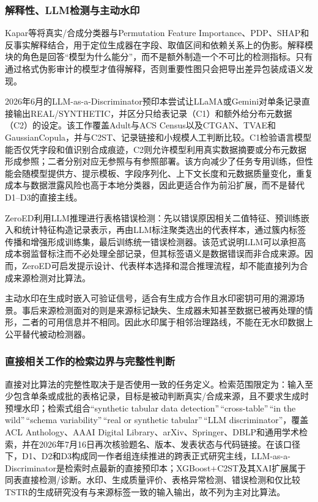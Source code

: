 \documentclass[
  chinese,
  12pt,
  a4paper,
  chinese,
  UTF8]{ctexart}
\begin{document}
\subsubsection{解释性、LLM检测与主动水印}\label{ux89e3ux91caux6027llmux68c0ux6d4bux4e0eux4e3bux52a8ux6c34ux5370}

Kapar等将真实/合成分类器与Permutation Feature
Importance、PDP、SHAP和反事实解释结合，用于定位生成器在字段、取值区间和依赖关系上的伪影\autocite{kapar2026xai}。解释模块的角色是回答``模型为什么能分''，而不是额外制造一个不可比的检测指标。只有通过格式伪影审计的模型才值得解释，否则重要性图只会把导出差异包装成语义发现。

2026年6月的LLM-as-a-Discriminator预印本尝试让LLaMA或Gemini对单条记录直接输出REAL/SYNTHETIC，并区分只给表记录（C1）和额外给分布元数据（C2）的设定\autocite{slokom2026llm}。该工作覆盖Adult与ACS
Census以及CTGAN、TVAE和GaussianCopula，并与C2ST、记录链接和小规模人工判断比较。C1检验语言模型能否仅凭字段和值识别合成痕迹，C2则允许模型利用真实数据摘要或分布元数据形成参照；二者分别对应无参照与有参照部署。该方向减少了任务专用训练，但性能会随模型提供方、提示模板、字段序列化、上下文长度和元数据质量变化，重复成本与数据泄露风险也高于本地分类器，因此更适合作为前沿扩展，而不是替代D1--D3的直接主线。

ZeroED利用LLM推理进行表格错误检测\autocite{ni2025zeroed}：先以错误原因相关二值特征、预训练嵌入和统计特征构造记录表示，再由LLM标注聚类选出的代表样本，通过簇内标签传播和增强形成训练集，最后训练统一错误检测器。该范式说明LLM可以承担高成本弱监督标注而不必处理全部记录，但其标签语义是数据错误而非合成来源。因而，ZeroED可启发提示设计、代表样本选择和混合推理流程，却不能直接列为合成来源检测对比算法。

主动水印在生成时嵌入可验证信号，适合有生成方合作且水印密钥可用的溯源场景。事后来源检测面对的则是来源标记缺失、生成器未知甚至数据已被再处理的情形，二者的可用信息并不相同。因此水印属于相邻治理路线，不能在无水印数据上公平替代被动检测器。

\subsubsection{直接相关工作的检索边界与完整性判断}\label{ux76f4ux63a5ux76f8ux5173ux5de5ux4f5cux7684ux68c0ux7d22ux8fb9ux754cux4e0eux5b8cux6574ux6027ux5224ux65ad}

直接对比算法的完整性取决于是否使用一致的任务定义。检索范围限定为：输入至少包含单条或成批的表格记录，目标是被动判断真实/合成来源，且不要求生成时预埋水印；检索式组合``synthetic
tabular data detection''\,``cross-table''\,``in the wild''\,``schema
variability''\,``real or synthetic tabular''\,``LLM
discriminator''，覆盖ACL Anthology、AAAI Digital
Library、arXiv、Springer、DBLP和通用学术检索，并在2026年7月16日再次核验题名、版本、发表状态与代码链接。在该口径下，D1、D2和D3构成同一作者组连续推进的跨表正式研究主线，LLM-as-a-Discriminator是检索时点最新的直接预印本；XGBoost+C2ST及其XAI扩展属于同表直接检测/诊断。水印、生成质量评价、表格异常检测、错误检测和仅比较TSTR的生成研究没有与来源标签一致的输入输出，故不列为主对比算法。
\end{document}
